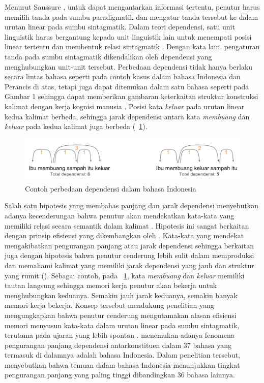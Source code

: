 Menurut Saussure \citep{key2017course}, untuk dapat mengantarkan informasi tertentu, penutur harus memilih tanda pada sumbu paradigmatik dan mengatur tanda tersebut ke dalam urutan linear pada sumbu sintagmatik. Dalam teori dependensi, satu unit linguistik harus bergantung kepada unit linguistik lain untuk menempati posisi linear tertentu dan membentuk relasi sintagmatik \citep{tesniere1959elements}. Dengan kata lain, pengaturan tanda pada sumbu sintagmatik dikendalikan oleh dependensi yang menghubungkan unit-unit tersebut. Perbedaan dependensi tidak hanya berlaku secara lintas bahasa seperti pada contoh kasus dalam bahasa Indonesia dan Perancis di atas, tetapi juga dapat ditemukan dalam satu bahasa seperti pada Gambar 1 sehingga dapat memberikan gambaran keterkaitan struktur konstruksi kalimat dengan kerja kognisi manusia \citep{gibson2000dependency}. Posisi kata \textit{keluar} pada urutan linear kedua kalimat berbeda, sehingga jarak dependensi antara kata \textit{membuang} dan \textit{keluar} pada kedua kalimat juga berbeda (\pic~\ref{fig:contoh-dependensi}). 
\begin{figure}
	\centering \includegraphics[width=1
	\textwidth] {pics/contoh-dependensi.png} \caption{Contoh perbedaan dependensi dalam bahasa Indonesia} 
\label{fig:contoh-dependensi} \end{figure}

Salah satu hipotesis yang membahas panjang dan jarak dependensi menyebutkan adanya kecenderungan bahwa penutur akan mendekatkan kata-kata yang memiliki relasi secara semantik dalam kalimat \citealp{futrell2015large, liu2017dependency}. Hipotesis ini sangat berkaitan dengan prinsip efisiensi yang dikembangkan oleh \cite{hawkins2004efficiency}. Kata-kata yang mendekat mengakibatkan pengurangan panjang atau jarak dependensi sehingga berkaitan juga dengan hipotesis bahwa penutur cenderung lebih sulit dalam memproduksi dan memahami kalimat yang memiliki jarak dependensi yang jauh dan struktur yang rumit (\citealp{hawkins2004efficiency, dillon2011structured}). Sebagai contoh, pada \pic~\ref{fig:contoh-dependensi}, kata \textit{membuang} dan \textit{keluar} memiliki tautan langsung sehingga memori kerja penutur akan bekerja untuk menghubungkan keduanya. Semakin jauh jarak keduanya, semakin banyak memori kerja bekerja. Konsep tersebut mendukung penelitian \cite{jaeger2006redundancy} yang mengungkapkan bahwa penutur cenderung mengutamakan alasan efisiensi memori menyusun kata-kata dalam urutan linear pada sumbu sintagmatik, terutama pada ujaran yang lebih spontan \citep{jaeger2006redundancy}. \cite{futrell2015large} menemukan adanya fenomena pengurangan panjang dependensi antarkonstituen dalam 37 bahasa yang termasuk di dalamnya adalah bahasa Indonesia. Dalam penelitian tersebut, \cite{futrell2015large} menyebutkan bahwa temuan dalam bahasa Indonesia menunjukkan tingkat pengurangan panjang yang paling tinggi dibandingkan 36 bahasa lainnya. 

